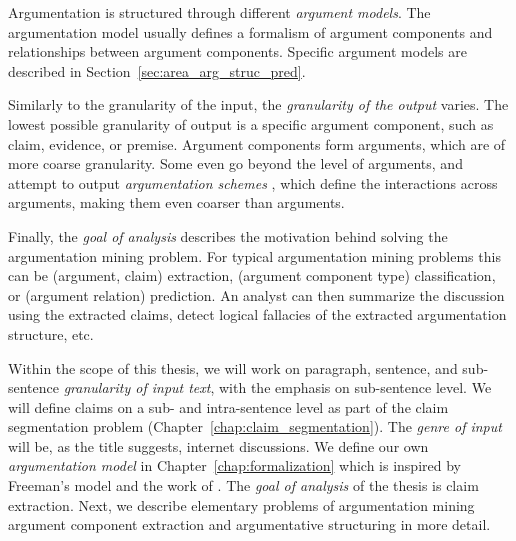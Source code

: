 Argumentation is structured through different \emph{argument models}.  The
argumentation model usually defines a formalism of argument components and
relationships between argument components.  Specific argument models are
described in Section~\ref{sec:area_arg_struc_pred}.

Similarly to the granularity of the input, the \emph{granularity of the output}
varies. The lowest possible granularity of output is a specific argument
component, such as claim, evidence, or premise. Argument components form arguments,
which are of more coarse granularity. Some even go beyond the level of arguments, 
and attempt to output \emph{argumentation schemes} \citep{feng2011classifying}, which
define the interactions across arguments, making them even coarser than arguments. 

Finally, the \emph{goal of analysis} describes the motivation behind solving
the argumentation mining problem. For typical argumentation mining problems
this can be (argument, claim) extraction, (argument component type)
classification, or (argument relation) prediction. An analyst can then 
summarize the discussion using the extracted claims, detect logical fallacies
of the extracted argumentation structure, etc.

Within the scope of this thesis, we will work on paragraph, sentence, and
sub-sentence \emph{granularity of input text}, with the emphasis on
sub-sentence level. We will define claims on a sub- and intra-sentence level as
part of the claim segmentation problem (Chapter~\ref{chap:claim_segmentation}).
The \emph{genre of input} will be, as the title suggests, internet discussions.
We define our own \emph{argumentation model} in
Chapter~\ref{chap:formalization} which is inspired by Freeman's model and the
work of \citet{hashimoto2012excitatory}.
The \emph{goal of analysis} of the thesis is claim extraction.
Next, we describe elementary problems of argumentation mining
argument component extraction and argumentative structuring 
in more detail.



